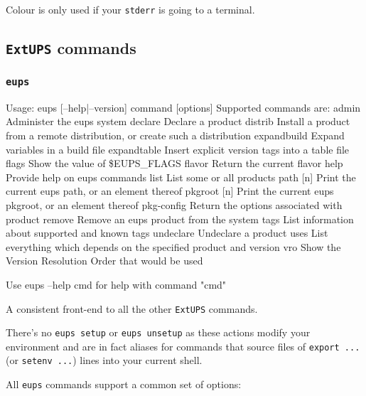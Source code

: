 \documentclass{article}
\newcommand{\code}[1]{\texttt{#1}}
\newcommand{\eups}{\code{ExtUPS}\xspace}
\let\overbatim=\verbatim
\let\oendverbatim=\endverbatim
\renewenvironment{verbatim}
{\center\minipage{16cm}\overbatim}
{\oendverbatim\endminipage\endcenter}
\begin{document}
Colour is only used if your \code{stderr} is going to a terminal.


\subsection{\eups commands}

\subsubsection{\code{eups}}
\begin{verbatim}
Usage:
        eups [--help|--version] command [options]
Supported commands are:
        admin           Administer the eups system
        declare         Declare a product
        distrib         Install a product from a remote distribution,
                        or create such a distribution 
        expandbuild     Expand variables in a build file
        expandtable     Insert explicit version tags into a table file
        flags           Show the value of \$EUPS_FLAGS
        flavor          Return the current flavor
        help            Provide help on eups commands
        list            List some or all products
        path [n]        Print the current eups path, or an element thereof
        pkgroot [n]     Print the current eups pkgroot, or an element thereof
        pkg-config      Return the options associated with product
        remove          Remove an eups product from the system
        tags            List information about supported and known tags
        undeclare       Undeclare a product
        uses            List everything which depends on the specified product 
                        and version
        vro             Show the Version Resolution Order that would be used

Use
        eups --help cmd
for help with command "cmd"
\end{verbatim}
  
A consistent front-end to all the other \eups commands.

There's no \code{eups setup} or \code{eups unsetup} as these actions
modify your environment and are in fact aliases for commands
that source files of \code{export ...} (or \code{setenv ...}) lines
into your current shell.

All \code{eups} commands support a common set of options:
\end{document}
